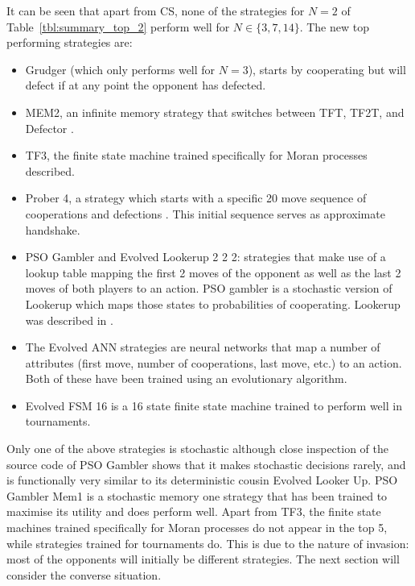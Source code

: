 \documentclass[10pt,letterpaper]{article}
\begin{document}
It can be seen that apart from CS, none of the strategies for \(N=2\)
of Table~\ref{tbl:summary_top_2} perform well for \(N\in\{3, 7, 14\}\). The new
top performing strategies are:

\begin{itemize}
    \item Grudger (which only performs well for \(N=3\)), starts by cooperating
        but will defect if at any point the opponent has defected.
    \item MEM2, an infinite memory strategy that switches between TFT, TF2T, and
        Defector \cite{Li2014}.
    \item TF3, the finite state machine trained specifically for Moran processes
        described.
    \item Prober 4, a strategy which starts with a specific 20 move sequence of
        cooperations and defections \cite{Prison1998}. This initial sequence serves
        as approximate handshake.
    \item  PSO Gambler and Evolved Lookerup 2 2 2: strategies that make use
        of a lookup table mapping the first 2 moves of the opponent as well as
        the last 2 moves of both players to an action. PSO gambler is a
        stochastic version of  Lookerup which maps those states to probabilities
       of cooperating. Lookerup was described in \cite{Knight2016}.
    \item The Evolved ANN strategies are neural networks that map a number of
	    attributes (first move, number of cooperations, last move, etc.) to
	    an action. Both of these have been trained using an evolutionary
	    algorithm.
    \item Evolved FSM 16 is a 16 state finite state machine trained to
        perform well in tournaments.
\end{itemize}

Only one of the above strategies is stochastic although close inspection of the
source code of PSO Gambler shows that it makes stochastic decisions rarely, and
is functionally very similar to its deterministic cousin Evolved Looker Up.
PSO Gambler Mem1 is a stochastic memory one strategy that has been trained to
maximise its utility and does perform well.
Apart from TF3, the finite state machines trained specifically for
Moran processes do not appear in the top 5, while strategies trained for
tournaments do. This is due to the nature of invasion: most of the opponents
will initially be different strategies. The next section will consider the
converse situation.
\end{document}
